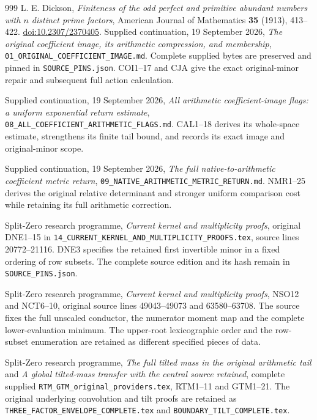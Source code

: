 \documentclass[11pt,a4paper]{article}
\begin{document}
\begin{thebibliography}{999}
L. E. Dickson,
\emph{Finiteness of the odd perfect and primitive abundant numbers
with \(n\) distinct prime factors},
American Journal of Mathematics \textbf{35} (1913), 413--422.
\href{https://doi.org/10.2307/2370405}{doi:10.2307/2370405}.
Supplied continuation, 19 September 2026,
\emph{The original coefficient image, its arithmetic compression,
and membership}, \texttt{01\_ORIGINAL\_COEFFICIENT\_IMAGE.md}.
Complete supplied bytes are preserved and pinned in
\texttt{SOURCE\_PINS.json}. COI1--17 and CJA give the exact
original-minor repair and subsequent full action calculation.

Supplied continuation, 19 September 2026,
\emph{All arithmetic coefficient-image flags: a uniform exponential
return estimate}, \texttt{08\_ALL\_COEFFICIENT\_ARITHMETIC\_FLAGS.md}.
CAL1--18 derives its whole-space estimate, strengthens its finite
tail bound, and records its exact image and original-minor scope.

Supplied continuation, 19 September 2026,
\emph{The full native-to-arithmetic coefficient metric return},
\texttt{09\_NATIVE\_ARITHMETIC\_METRIC\_RETURN.md}.
NMR1--25 derives the original relative determinant and stronger
uniform comparison cost while retaining its full arithmetic correction.

Split-Zero research programme, \emph{Current kernel and multiplicity
proofs}, original DNE1--15 in
\texttt{14\_CURRENT\_KERNEL\_AND\_MULTIPLICITY\_PROOFS.tex},
source lines 20772--21116. DNE3 specifies the retained first
invertible minor in a fixed ordering of row subsets. The complete
source edition and its hash remain in \texttt{SOURCE\_PINS.json}.

Split-Zero research programme, \emph{Current kernel and multiplicity
proofs}, NSO12 and NCT6--10, original source lines 49043--49073
and 63580--63708. The source fixes the full unscaled conductor,
the numerator moment map and the complete lower-evaluation minimum.
The upper-root lexicographic order and the row-subset enumeration
are retained as different specified pieces of data.

Split-Zero research programme, \emph{The full tilted mass in the
original arithmetic tail} and \emph{A global tilted-mass transfer
with the central source retained}, complete supplied
\texttt{RTM\_GTM\_original\_providers.tex}, RTM1--11 and GTM1--21.
The original underlying convolution and tilt proofs are retained
as \texttt{THREE\_FACTOR\_ENVELOPE\_COMPLETE.tex} and
\texttt{BOUNDARY\_TILT\_COMPLETE.tex}.


\end{thebibliography}
\end{document}
